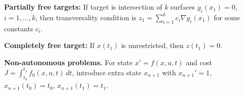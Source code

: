 \documentclass[12pt]{article}
\begin{document}
\textbf{Partially free targets:} If target is intersection of $k$ surfaces $g_i(x_1)=0$, $i=1,\ldots,k$, then transversality condition is $z_1 = \sum_{i=1}^k c_i \nabla g_i(x_1)$ for some constants $c_i$.

\textbf{Completely free target:} If $x(t_1)$ is unrestricted, then $z(t_1)=0$.

\medskip
\textbf{Non-autonomous problems.} For state $x' = f(x,u,t)$ and cost $J=\int_{t_0}^{t_1} f_0(x,u,t)\,dt$, introduce extra state $x_{n+1}$ with $x_{n+1}' = 1$, $x_{n+1}(t_0)=t_0$, $x_{n+1}(t_1)=t_1$.
\end{document}
